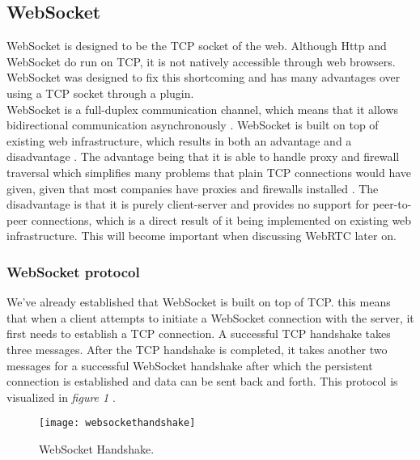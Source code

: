 \documentclass[prodmode,acmtecs]{acmsmall}
\begin{document}
\subsection{WebSocket}
WebSocket is designed to be the TCP socket of the web. Although Http and WebSocket do run on TCP, it is not natively accessible through web browsers. WebSocket was designed to fix this shortcoming and has many advantages over using a TCP socket through a plugin. \\

WebSocket is a full-duplex communication channel, which means that it allows bidirectional communication asynchronously \cite{rakhundereal}. WebSocket is built on top of existing web infrastructure, which results in both an advantage and a disadvantage \cite{skvorc2014performance}. The advantage being that it is able to handle proxy and firewall traversal which simplifies many problems that plain TCP connections would have given, given that most companies have proxies and firewalls installed \cite{almasi2013evaluation}. The disadvantage is that it is purely client-server and provides no support for peer-to-peer connections, which is a direct result of it being implemented on existing web infrastructure. This will become important when discussing WebRTC later on. \\

\subsubsection{WebSocket protocol}
We've already established that WebSocket is built on top of TCP. this means that when a client attempts to initiate a WebSocket connection with the server, it first needs to establish a TCP connection. A successful TCP handshake takes three messages. After the TCP handshake is completed, it takes another two messages for a successful WebSocket handshake after which the persistent connection is established and data can be sent back and forth. This protocol is visualized in \textit{figure 1} \cite{skvorc2014performance}.


\begin{figure}
\centerline{\texttt{[image: websockethandshake]}}
\caption{WebSocket Handshake.}
\label{figure:one}
\end{figure}
\end{document}
